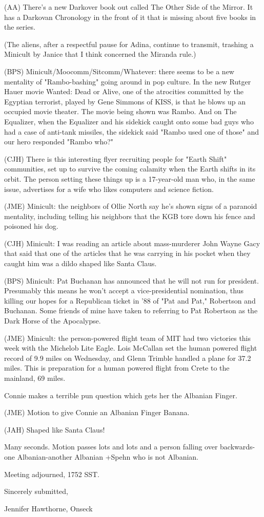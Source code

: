 \documentclass[12pt]{article}
\begin{document}
(AA) There's a new Darkover book out called The Other Side of the Mirror. It has a Darkovan Chronology in the front of it that is missing about five books in the series.

(The aliens, after a respectful pause for Adina, continue to transmit, trashing a Minicult by Janice that I think concerned the Miranda rule.)

(BPS) Minicult/Moocomm/Sitcomm/Whatever: there seems to be a new mentality of "Rambo-bashing" going around in pop culture. In the new Rutger Hauer movie Wanted: Dead or Alive, one of the atrocities committed by the Egyptian terrorist, played by Gene Simmons of KISS, is that he blows up an occupied movie theater. The movie being shown was Rambo. And on The Equalizer, when the Equalizer and his sidekick caught onto some bad guys who had a case of anti-tank missiles, the sidekick said "Rambo used one of those" and our hero responded "Rambo who?"

(CJH) There is this interesting flyer recruiting people for "Earth Shift" communities, set up to survive the coming calamity when the Earth shifts in its orbit. The person setting these things up is a 17-year-old man who, in the same issue, advertises for a wife who likes computers and science fiction.

(JME) Minicult: the neighbors of Ollie North say he's shown signs of a paranoid mentality, including telling his neighbors that the KGB tore down his fence and poisoned his dog.

(CJH) Minicult: I was reading an article about mass-murderer John Wayne Gacy that said that one of the articles that he was carrying in his pocket when they caught him was a dildo shaped like Santa Claus.

(BPS) Minicult: Pat Buchanan has announced that he will not run for president. Presumably this means he won't accept a vice-presidential nomination, thus killing our hopes for a Republican ticket in '88 of "Pat and Pat," Robertson and Buchanan. Some friends of mine have taken to referring to Pat Robertson as the Dark Horse of the Apocalypse.

(JME) Minicult: the person-powered flight team of MIT had two victories this week with the Michelob Lite Eagle. Lois McCallan set the human powered flight record of 9.9 miles on Wednesday, and Glenn Trimble handled a plane for 37.2 miles. This is preparation for a human powered flight from Crete to the mainland, 69 miles.

Connie makes a terrible pun question which gets her the Albanian Finger.

(JME) Motion to give Connie an Albanian Finger Banana.

(JAH) Shaped like Santa Claus!

Many seconds. Motion passes lots and lots and a person falling over backwards-one Albanian-another Albanian +Spehn who is not Albanian.

\vspace{12pt}

\noindent
Meeting adjourned, 1752 SST.

\vspace{18pt}

\centerline{Sincerely submitted,}
\centerline{Jennifer Hawthorne, Onseck}
\end{document}
